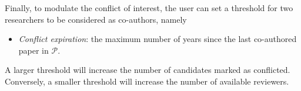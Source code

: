 Finally, to modulate the conflict of interest, the user can set a threshold for two researchers to be considered as co-authors, namely 
\begin{itemize}
\item \emph{Conflict expiration}: the maximum number of years since the last co-authored paper in $\mathcal{P}$. 
\end{itemize}
A larger threshold will increase the number of candidates marked as conflicted. Conversely, a smaller threshold will increase the number of available reviewers. 



